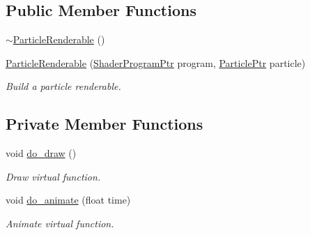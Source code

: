 \subsection*{Public Member Functions}
\begin{DoxyCompactItemize}
\item 
\hyperlink{classParticleRenderable_ab7f784b3520710e88d349a4c2f0f0ad1}{$\sim$\+Particle\+Renderable} ()
\item 
\hyperlink{classParticleRenderable_a3e5c194bb7e8f1470af0fc0e5d51e66e}{Particle\+Renderable} (\hyperlink{ShaderProgram_8hpp_af8e4af1ad4c53875ee5d32ab7e1f4966}{Shader\+Program\+Ptr} program, \hyperlink{Particle_8hpp_a9a7abc8635002993537b61ef2c857fdd}{Particle\+Ptr} particle)
\begin{DoxyCompactList}\small\item\em Build a particle renderable. \end{DoxyCompactList}\end{DoxyCompactItemize}
\subsection*{Private Member Functions}
\begin{DoxyCompactItemize}
\item 
void \hyperlink{classParticleRenderable_a1313290984b718988098504838fd4ee9}{do\+\_\+draw} ()
\begin{DoxyCompactList}\small\item\em Draw virtual function. \end{DoxyCompactList}\item 
void \hyperlink{classParticleRenderable_a8c4e33166ba0e4ee4cf1985eedea5aa3}{do\+\_\+animate} (float time)
\begin{DoxyCompactList}\small\item\em Animate virtual function. \end{DoxyCompactList}\end{DoxyCompactItemize}
